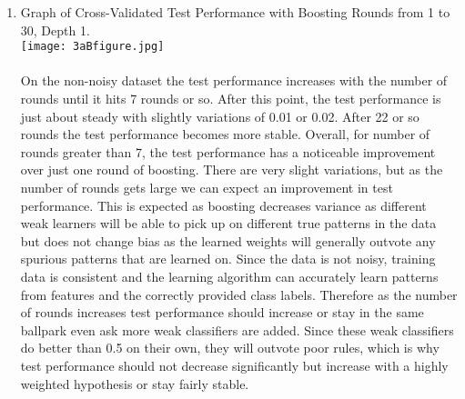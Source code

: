 \documentclass[12pt,letterpaper]{article}
\begin{document}
\begin{enumerate}
\begin{enumerate}
{\begin{enumerate}
The performance of the resulting classifier after boosting does better overall on non noisy data than on noisy data. This, of course, is a natural result as noise in general throws off learning by providing an inconsistent data set. Also, on the noisy dataset we see that test performance decreases slightly from 0.82 to 0.81 from 10 to 30 rounds of boosting. This displays the vulnerability of boosting to noise, one of its serious practical limitations. If there is inconsistent data, boosting will increase the weight of these data points since they are difficult to explain with its current set of rules. Boosting will try hard to classify these correctly after many rounds which may affect its accuracy on true data. \\ \\
On the non noisy data we see the trend that increasing the rounds of boosting from 10 to 30 with trees of depth 1 increases test performance. This displays the gains that boosting makes on non noisy data sets. There is no change on the non noisy dataset for trees of depth 2, but recall that this is because these trees are overfitted with training performance of 1.0, so boosting does not actually act. \medskip \\

\item Graph of Cross-Validated Test Performance with Boosting Rounds from 1 to 30, Depth 1. 
\\
  \texttt{[image: 3aBfigure.jpg]}\\ \medskip \\
  On the non-noisy dataset the test performance increases with the number of rounds until it hits 7 rounds or so. After this point, the test performance is just about steady with slightly variations of 0.01 or 0.02. After 22 or so rounds the test performance becomes more stable. Overall, for number of rounds greater than 7, the test performance has a noticeable improvement over just one round of boosting. There are very slight variations, but as the number of rounds gets large we can expect an improvement in test performance. This is expected as boosting decreases variance as different weak learners will be able to pick up on different true patterns in the data but does not change bias as the learned weights will generally outvote any spurious patterns that are learned on. Since the data is not noisy, training data is consistent and the learning algorithm can accurately learn patterns from features and the correctly provided class labels. Therefore as the number of rounds increases test performance should increase or stay in the same ballpark even ask more weak classifiers are added. Since these weak classifiers do better than 0.5 on their own, they will outvote poor rules, which is why test performance should not decrease significantly but increase with a highly weighted hypothesis or stay fairly stable.
        \\


\end{enumerate}}
\end{enumerate}
\end{enumerate}
\end{document}
